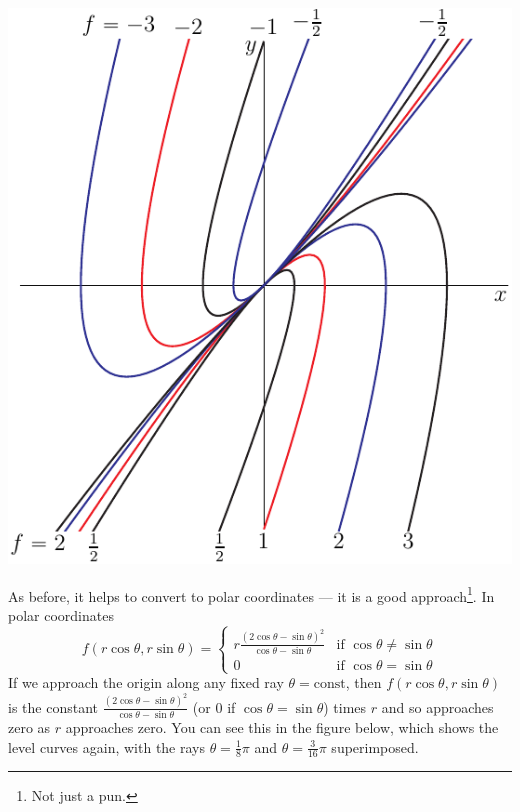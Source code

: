 \begin{eg}
\begin{efig}
\begin{center}
   \includegraphics[scale=0.8]{noLim.pdf}
\end{center}
\end{efig}
As before, it helps to convert to polar coordinates --- it is a good 
approach\footnote{Not just a pun.}.
In polar coordinates
$$
f(r\cos\theta,r\sin\theta)
=\begin{cases}
             r\frac{(2\cos\theta-\sin\theta)^2}{\cos\theta-\sin\theta} & 
               \text{if $\cos\theta\ne\sin\theta$}\\[0.05in]
                  0 & \text{if $\cos\theta=\sin\theta$}
 \end{cases}
$$ 
If we approach the origin along any fixed ray $\theta=\text{const}$, 
then $f(r\cos\theta,r\sin\theta)$ is the constant 
$\frac{(2\cos\theta-\sin\theta)^2}{\cos\theta-\sin\theta}$ 
(or $0$ if $\cos\theta=\sin\theta$) times $r$ and so approaches zero as 
$r$ approaches zero. You can see this in the figure below, which shows 
the level curves again, with the rays $\theta=\frac{1}{8}\pi$  
and $\theta=\frac{3}{16}\pi$ superimposed. 
\vadjust{
\begin{efig}
\begin{center}

\end{center}
\end{efig}}
\end{eg}
